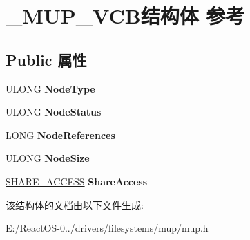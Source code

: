\hypertarget{struct___m_u_p___v_c_b}{}\section{\+\_\+\+M\+U\+P\+\_\+\+V\+C\+B结构体 参考}
\label{struct___m_u_p___v_c_b}
\subsection*{Public 属性}
\begin{DoxyCompactItemize}
\item 
\mbox{\label{struct___m_u_p___v_c_b_a4cd79d9815c63882b28ca1c66f7fba7d}} 
U\+L\+O\+NG {\bfseries Node\+Type}
\item 
\mbox{\label{struct___m_u_p___v_c_b_a9d3c2f233764e5ee82acfc2a9ede5ef4}} 
U\+L\+O\+NG {\bfseries Node\+Status}
\item 
\mbox{\label{struct___m_u_p___v_c_b_acaf747db662793114b9f1a1ef347e8a0}} 
L\+O\+NG {\bfseries Node\+References}
\item 
\mbox{\label{struct___m_u_p___v_c_b_ae42e7faa2c379e4b01488b7a05d697c8}} 
U\+L\+O\+NG {\bfseries Node\+Size}
\item 
\mbox{\label{struct___m_u_p___v_c_b_ad009218820fb32f5108756010e1b7b4e}} 
\hyperlink{struct___s_h_a_r_e___a_c_c_e_s_s}{S\+H\+A\+R\+E\+\_\+\+A\+C\+C\+E\+SS} {\bfseries Share\+Access}
\end{DoxyCompactItemize}


该结构体的文档由以下文件生成\+:\begin{DoxyCompactItemize}
\item 
E\+:/\+React\+O\+S-\/0../drivers/filesystems/mup/mup.\+h\end{DoxyCompactItemize}
